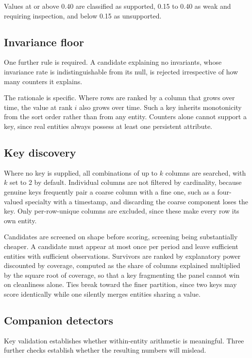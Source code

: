 \documentclass[preprint,12pt]{elsarticle}
\begin{document}
Values at or above 0.40 are classified as supported, 0.15 to 0.40 as weak and
requiring inspection, and below 0.15 as unsupported.

\subsection{Invariance floor}

One further rule is required. A candidate explaining no invariants, whose
invariance rate is indistinguishable from its null, is rejected irrespective of
how many counters it explains.

The rationale is specific. Where rows are ranked by a column that grows over
time, the value at rank $i$ also grows over time. Such a key inherits
monotonicity from the sort order rather than from any entity. Counters alone
cannot support a key, since real entities always possess at least one persistent
attribute.

\subsection{Key discovery}

Where no key is supplied, all combinations of up to $k$ columns are searched,
with $k$ set to 2 by default. Individual columns are not filtered by
cardinality, because genuine keys frequently pair a coarse column with a fine
one, such as a four-valued specialty with a timestamp, and discarding the coarse
component loses the key. Only per-row-unique columns are excluded, since these
make every row its own entity.

Candidates are screened on shape before scoring, screening being substantially
cheaper. A candidate must appear at most once per period and leave sufficient
entities with sufficient observations. Survivors are ranked by explanatory power
discounted by coverage, computed as the share of columns explained multiplied by
the square root of coverage, so that a key fragmenting the panel cannot win on
cleanliness alone. Ties break toward the finer partition, since two keys may
score identically while one silently merges entities sharing a value.

\subsection{Companion detectors}

Key validation establishes whether within-entity arithmetic is meaningful. Three
further checks establish whether the resulting numbers will mislead.
\end{document}

